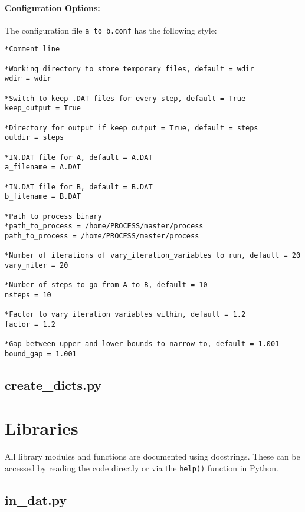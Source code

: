 \paragraph{Configuration Options:}

The configuration file \texttt{a\_to\_b.conf} has the following style:
\begin{framed}
\begin{verbatim}
*Comment line

*Working directory to store temporary files, default = wdir
wdir = wdir

*Switch to keep .DAT files for every step, default = True
keep_output = True

*Directory for output if keep_output = True, default = steps
outdir = steps

*IN.DAT file for A, default = A.DAT
a_filename = A.DAT

*IN.DAT file for B, default = B.DAT
b_filename = B.DAT

*Path to process binary
*path_to_process = /home/PROCESS/master/process
path_to_process = /home/PROCESS/master/process

*Number of iterations of vary_iteration_variables to run, default = 20
vary_niter = 20

*Number of steps to go from A to B, default = 10
nsteps = 10

*Factor to vary iteration variables within, default = 1.2
factor = 1.2

*Gap between upper and lower bounds to narrow to, default = 1.001
bound_gap = 1.001
\end{verbatim}
\end{framed}

\subsection{create\_dicts.py}


\section{Libraries}
\label{sec:py_lib}

All library modules and functions are documented using docstrings. These can
be accessed by reading the code directly or via the \texttt{help()} function
in Python.

\subsection{in\_dat.py}

